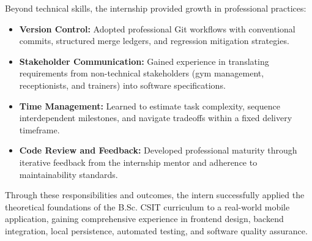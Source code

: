 Beyond technical skills, the internship provided growth in professional practices:
\begin{itemize}
    \item \textbf{Version Control:} Adopted professional Git workflows with conventional commits, structured merge ledgers, and regression mitigation strategies.
    \item \textbf{Stakeholder Communication:} Gained experience in translating requirements from non-technical stakeholders (gym management, receptionists, and trainers) into software specifications.
    \item \textbf{Time Management:} Learned to estimate task complexity, sequence interdependent milestones, and navigate tradeoffs within a fixed delivery timeframe.
    \item \textbf{Code Review and Feedback:} Developed professional maturity through iterative feedback from the internship mentor and adherence to maintainability standards.
\end{itemize}

Through these responsibilities and outcomes, the intern successfully applied the theoretical foundations of the B.Sc. CSIT curriculum to a real-world mobile application, gaining comprehensive experience in frontend design, backend integration, local persistence, automated testing, and software quality assurance.
